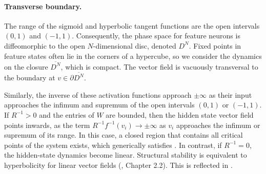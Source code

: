 \documentclass[12pt]{article}
\begin{document}
\paragraph{Transverse boundary.}
The range of the sigmoid and hyperbolic tangent functions are the open intervals $(0,1)$ and $(-1,1)$. Consequently, the phase space for feature neurons is diffeomorphic to the open $N$-dimensional disc, denoted $D^N$. Fixed points in feature states often lie in the corners of a hypercube, so we consider the dynamics on the closure $\overline{D^N}$, which is compact. The vector field is vacuously transversal to the boundary at $v \in \partial \overline{D^N}$. 

Similarly, the inverse of these activation functions approach $\pm \infty$ as their input approaches the infimum and supremum of the open intervals $(0,1)$ or $(-1,1)$. If $R^{-1} > 0$ and the entries of $W$ are bounded, then the hidden state vector field points inwards, as the term $R^{-1}f^{-1}(v_i) \rightarrow \pm\infty$ as $v_i$ approaches the infimum or supremum of its range. In this case, a closed region that contains all critical points of the system exists, which generically satisfies . In contrast, if $R^{-1} = 0$, the hidden-state dynamics become linear. Structural stability is equivalent to hyperbolicity for linear vector fields (\cite{palis2012geometric}, Chapter 2.2). This is reflected in .
\end{document}
